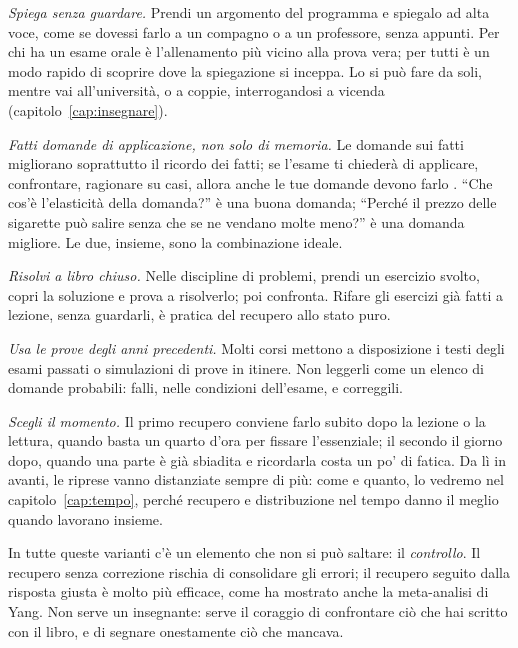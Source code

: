 \emph{Spiega senza guardare.} Prendi un argomento del programma e
spiegalo ad alta voce, come se dovessi farlo a un compagno o a un
professore, senza appunti. Per chi ha un esame orale è l'allenamento
più vicino alla prova vera; per tutti è un modo rapido di scoprire dove
la spiegazione si inceppa. Lo si può fare da soli, mentre vai
all'università, o a coppie, interrogandosi a vicenda (capitolo~\ref{cap:insegnare}).

\emph{Fatti domande di applicazione, non solo di memoria.} Le domande
sui fatti migliorano soprattutto il ricordo dei fatti; se l'esame ti
chiederà di applicare, confrontare, ragionare su casi, allora anche le
tue domande devono farlo \parencite{agarwal2019}. \enquote{Che cos'è
l'elasticità della domanda?} è una buona domanda; \enquote{Perché il
prezzo delle sigarette può salire senza che se ne vendano molte meno?}
è una domanda migliore. Le due, insieme, sono la combinazione ideale.

\emph{Risolvi a libro chiuso.} Nelle discipline di problemi, prendi un
esercizio svolto, copri la soluzione e prova a risolverlo; poi
confronta. Rifare gli esercizi già fatti a lezione, senza guardarli, è
pratica del recupero allo stato puro.

\emph{Usa le prove degli anni precedenti.} Molti corsi mettono a
disposizione i testi degli esami passati o simulazioni di prove in
itinere. Non leggerli come un elenco di domande probabili: falli, nelle
condizioni dell'esame, e correggili.

\emph{Scegli il momento.} Il primo recupero conviene farlo subito dopo
la lezione o la lettura, quando basta un quarto d'ora per fissare
l'essenziale; il secondo il giorno dopo, quando una parte è già
sbiadita e ricordarla costa un po' di fatica. Da lì in avanti, le
riprese vanno distanziate sempre di più: come e quanto, lo vedremo nel
capitolo~\ref{cap:tempo}, perché recupero e distribuzione nel tempo
danno il meglio quando lavorano insieme.

In tutte queste varianti c'è un elemento che non si può saltare: il
\emph{controllo}. Il recupero senza correzione rischia di consolidare
gli errori; il recupero seguito dalla risposta giusta è molto più
efficace, come ha mostrato anche la meta-analisi di Yang. Non serve un
insegnante: serve il coraggio di confrontare ciò che hai scritto con il
libro, e di segnare onestamente ciò che mancava.


